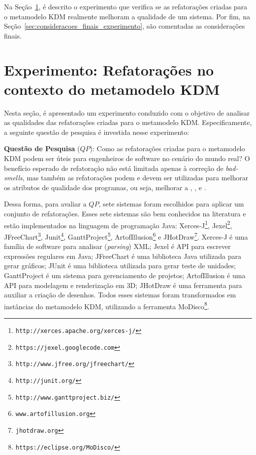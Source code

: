 Na Seção~\ref{sec:experimento}, é descrito o experimento que verifica se as refatorações criadas para o metamodelo KDM realmente melhoram a qualidade de um sistema. Por fim, na Seção~\ref{sec:consideracoes_finais_experimento}, são comentadas as considerações finais.


\section{Experimento: Refatorações no contexto do metamodelo KDM}\label{sec:experimento}

Nesta seção, é apresentado um experimento conduzido com o objetivo de analisar as qualidades das refatorações criadas para o metamodelo KDM. Especificamente, a seguinte questão de pesquisa é investida nesse experimento:

\textbf{Questão de Pesquisa} (\textbf{$QP$}): Como as refatorações criadas para o metamodelo KDM podem ser úteis para engenheiros de software no cenário do mundo real? O benefício esperado de refatoração não está limitada apenas à correção de \textit{bad-smells}, mas também as refatorações podem e devem ser utilizadas para melhorar os atributos de qualidade dos programas, ou seja, melhorar a , ,  e .


Dessa forma, para avaliar a \textbf{$QP$}, sete sistemas foram escolhidos para aplicar um conjunto de refatorações. Esses sete sistemas são bem conhecidos na literatura e estão implementados na linguagem de programação Java: Xerces-J\footnote{\texttt{http://xerces.apache.org/xerces-j/}}, Jexel\footnote{\texttt{https://jexel.googlecode.com}}, JFreeChart\footnote{\texttt{http://www.jfree.org/jfreechart/}}, Junit\footnote{\texttt{http://junit.org/}}, GanttProject\footnote{\texttt{http://www.ganttproject.biz/}}, ArtofIllusion\footnote{\texttt{www.artofillusion.org}} e JHotDraw\footnote{\texttt{jhotdraw.org}}. Xerces-J é uma família de software para analisar (\textit{parsing}) XML; Jexel é API para escrever expressões regulares em Java; JFreeChart é uma biblioteca Java utilizada para gerar gráficos; JUnit é uma biblioteca utilizada para gerar teste de unidades; GanttProject é um sistema para gerenciamento de projetos; ArtofIllusion é uma API para modelagem e renderização em 3D; JHotDraw é uma ferramenta para auxiliar a criação de desenhos. Todos esses sistemas foram transformados em instâncias do metamodelo KDM, utilizando a ferramenta MoDisco\footnote{\texttt{https://eclipse.org/MoDisco/}}. 


